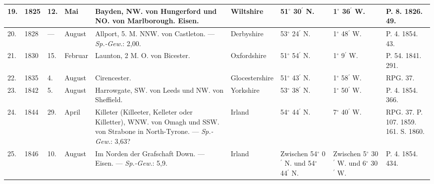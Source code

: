\documentclass[a4paper, 8pt, oneside, polutonikogreek, german]{article}
\begin{document}
\begin{center}
\begin{longtable}{|p{3mm}|p{7mm}|p{3mm}|p{11mm}|p{30mm}|p{20mm}|p{11mm}|p{11mm}|p{11mm}|}
        19. & 1825 & 12. & Mai & Bayden, NW. von Hungerford und NO. von Marlborough. Eisen. & Wiltshire & 51$^\circ$ 30$^\prime$ N. & 1$^\circ$ 36$^\prime$ W. & P. 8. 1826. 49. \\ \hline
        20. & 1828 & --- & August & Allport, 5. M. NNW. von Castleton. --- \emph{Sp.-Gew.}: 2,00. & Derbyshire & 53$^\circ$ 24$^\prime$ N. & 1$^\circ$ 48$^\prime$ W. & P. 4. 1854. 43. \\ \hline
        21. & 1830 & 15. & Februar & Launton, 2 M. O. von Bicester. & Oxfordshire & 51$^\circ$ 54$^\prime$ N. & 1$^\circ$ 9$^\prime$ W. & P. 54. 1841. 291. \\ \hline
        22. & 1835 & 4. & August & Cirencester. & Glocestershire & 51$^\circ$ 43$^\prime$ N. & 1$^\circ$ 58$^\prime$ W. & RPG. 37. \\ \hline
        23. & 1842 & 5. & August & Harrowgate, SW. von Leeds und NW. von Sheffield. & Yorkshire & 53$^\circ$ 38$^\prime$ N. & 1$^\circ$ 50$^\prime$ W. & P. 4. 1854. 366. \\ \hline
        24. & 1844 & 29. & April & Killeter (Killeeter, Kelleter oder Killetter), WNW. von Omagh und SSW. von Strabone in North-Tyrone. --- \emph{Sp.-Gew.}: 3,63? & Irland & 54$^\circ$ 44$^\prime$ N. & 7$^\circ$ 40$^\prime$ W. & RPG. 37. P. 107. 1859. 161. S. 1860. \\ \hline
        25. & 1846 & 10. & August & Im Norden der Grafschaft Down. --- Eisen. --- \emph{Sp.-Gew.}: 5,9. & Irland & Zwischen 54$^\circ$ 0$^\prime$ N. und 54$^\circ$ 44$^\prime$ N. & Zwischen 5$^\circ$ 30$^\prime$ W. und 6$^\circ$ 30$^\prime$ W. & P. 4. 1854. 434. \\ \hline
    \end{longtable}
\end{center}
\end{document}
